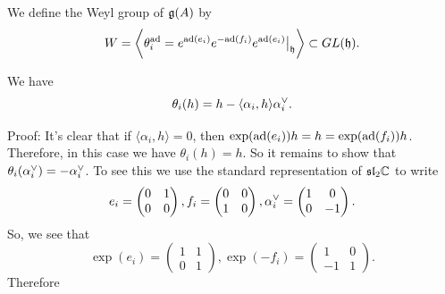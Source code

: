 \begin{dang}
    \begin{definition}
        We define the Weyl group of $\mathfrak{g}(A)$ by 
        \begin{equation}
            W = \biggl\langle \theta^{\text{ad}}_i = e^{\text{ad}(e_i)}e^{-\text{ad}(f_i)}e^{\text{ad}(e_i)} \big|_{\mathfrak{h}} \biggr\rangle \subset GL(\mathfrak{h}).
        \end{equation}
    \end{definition}
\end{dang}

\begin{dang}
    \begin{lemma}
        We have 
        \begin{equation}\label{equation : Weyl group action on coroots}
    \theta_i(h) = h - \langle \alpha_i, h\rangle \alpha^{\vee}_i.
         \end{equation}
    \end{lemma}
\end{dang}
Proof: It's clear that if $\langle\alpha_i, h\rangle = 0$, then $\exp(\text{ad}(e_i))h= h = \exp(\text{ad}(f_i))h$. Therefore, in this case we 
have $\theta_i(h) = h$. So it remains to show that $\theta_i(\alpha^{\vee}_i) = -\alpha^{\vee}_i$. To see this we use the 
standard representation of $\mathfrak{sl}_2\mathbb{C}$ to write 
\begin{equation}
    e_i = \begin{pmatrix}
        0&1\\0&0
    \end{pmatrix},
    f_i = \begin{pmatrix}
        0&0\\1&0
    \end{pmatrix},
    \alpha^{\vee}_i = 
    \begin{pmatrix}
        1&0\\0&-1
    \end{pmatrix}.
\end{equation}
So, we see that 
\begin{equation}
    \exp(e_i) = \begin{pmatrix}
        1&1\\0&1
    \end{pmatrix},
    \exp(-f_i) = \begin{pmatrix}
        1&0\\-1&1
    \end{pmatrix}.
\end{equation}
Therefore
